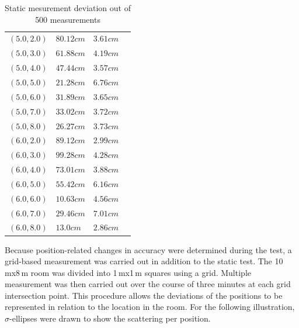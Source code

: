 \documentclass[conference, a4paper]{IEEEtran}
\begin{document}
\begin{table}[hbt!]
\begin{tabular}{l l l c}
		$(5.0,2.0)$ & $80.12cm$ & $3.61cm$\\
		$(5.0,3.0)$ & $61.88cm$ & $4.19cm$\\
		$(5.0,4.0)$ & $47.44cm$ & $3.57cm$\\
		$(5.0,5.0)$ & $21.28cm$ & $6.76cm$\\
		$(5.0,6.0)$ & $31.89cm$ & $3.65cm$\\
		$(5.0,7.0)$ & $33.02cm$ & $3.72cm$\\
		$(5.0,8.0)$ & $26.27cm$ & $3.73cm$\\
		
		$(6.0,2.0)$ & $89.12cm$ & $2.99cm$\\
		$(6.0,3.0)$ & $99.28cm$ & $4.28cm$\\
		$(6.0,4.0)$ & $73.01cm$ & $3.88cm$\\
		$(6.0,5.0)$ & $55.42cm$ & $6.16cm$\\
		$(6.0,6.0)$ & $10.63cm$ & $4.56cm$\\
		$(6.0,7.0)$ & $29.46cm$ & $7.01cm$\\
		$(6.0,8.0)$ & $13.0cm$ & $2.86cm$\\
		
	\end{tabular}
	\caption{Static mesurement deviation out of 500 measurements}
\end{table}

Because position-related changes in accuracy were determined during the test,
a grid-based measurement was carried out in addition to the static test.
The 10\,mx8\,m room was divided into 1\,mx1\,m squares using a grid.
Multiple measurement was then carried out over the course of three minutes at each grid intersection point.
This procedure allows the deviations of the positions to be represented in relation to the location in the room.
For the following illustration, $\sigma$-ellipses were drawn to show the scattering per position.
\end{document}
